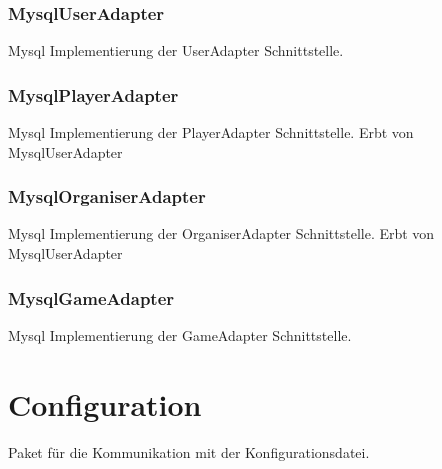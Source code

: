 \documentclass[a4paper]{scrreprt}
\begin{document}
	\subsubsection{MysqlUserAdapter}
	Mysql Implementierung der UserAdapter Schnittstelle.

	\subsubsection{MysqlPlayerAdapter}
	Mysql Implementierung der PlayerAdapter Schnittstelle.
	Erbt von MysqlUserAdapter

	\subsubsection{MysqlOrganiserAdapter}
	Mysql Implementierung der OrganiserAdapter Schnittstelle.
	Erbt von MysqlUserAdapter

	\subsubsection{MysqlGameAdapter}
	Mysql Implementierung der GameAdapter Schnittstelle.

	\section{Configuration}
	Paket für die Kommunikation mit der Konfigurationsdatei.
\end{document}

